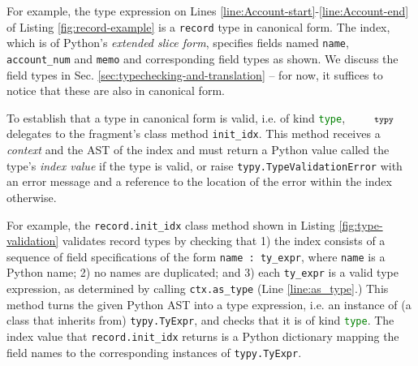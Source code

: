\documentclass[10pt]{sigplanconf}
\newcommand{\typy}{\texttt{\footnotesize typy}}
\newcommand{\lip}[1]{\lstinline[language=Python,basicstyle=\ttfamily\footnotesize,morekeywords={with},deletendkeywords={tuple,buffer,map}]{#1}}
\begin{document}
For example, the type expression on Lines \ref{line:Account-start}-\ref{line:Account-end} of Listing \ref{fig:record-example} is a \lip{record} type in canonical form. The index, which is of Python's \emph{extended slice form}, specifies fields named \lip{name}, \lip{account_num} and \lip{memo} and  corresponding field types as shown. We discuss the field types in Sec. \ref{sec:typechecking-and-translation} -- for now, it suffices to notice that these are also in canonical form.

To establish that a type in canonical form is valid, i.e. of kind \lip{type}, $\typy$ delegates to the fragment's class method \lip{init_idx}. This method receives  a \emph{context} and the AST of the index and must return a Python value called the type's \emph{index value} if the type is valid, or raise \lip{typy.TypeValidationError} with an error message and a reference to the location of the error within the index otherwise. %

For example, the \lip{record.init_idx} class method shown in Listing \ref{fig:type-validation} validates record types by checking that 1) the index consists of a  sequence of field specifications of the form \lip{name : ty_expr}, where \lip{name} is a Python name; 2) no names are duplicated; and 3) each \lip{ty_expr} is a valid type expression, as determined by calling \lip{ctx.as_type} (Line \ref{line:as_type}.) This method turns the given Python AST into a type expression, i.e. an instance of (a class that inherits from) \lip{typy.TyExpr}, and checks that it is of kind \lip{type}. The index value that \lip{record.init_idx} returns is a Python dictionary mapping the field names to the corresponding instances of \lip{typy.TyExpr}.

\end{document}

